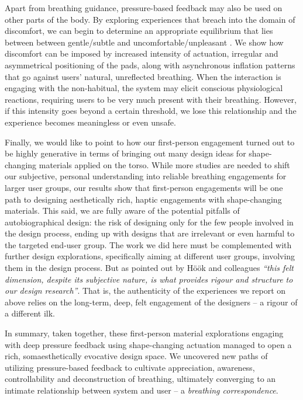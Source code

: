Apart from breathing guidance, pressure-based feedback may also be used on other parts of the body. By exploring experiences that breach into the domain of discomfort, we can begin to determine an appropriate equilibrium that lies between between gentle/subtle and uncomfortable/unpleasant \cite{benford_uncomfortable_2012}. We show how discomfort can be imposed by increased intensity of actuation, irregular and asymmetrical positioning of the pads, along with asynchronous inflation patterns that go against users' natural, unreflected breathing. When the interaction is engaging with the non-habitual, the system may elicit conscious physiological reactions, requiring users to be very much present with their breathing. However, if this intensity goes beyond a certain threshold, we lose this relationship and the experience becomes meaningless or even unsafe.


Finally, we would like to point to how our first-person engagement turned out to be highly generative in terms of bringing out many design ideas for shape-changing materials applied on the torso. While more studies are needed to shift our subjective, personal understanding into reliable breathing engagements for larger user groups, our results show that first-person engagements will be one path to designing aesthetically rich, haptic engagements with shape-changing materials. This said, we are fully aware of the potential pitfalls of autobiographical design: the risk of designing only for the few people involved in the design process, ending up with designs that are irrelevant or even harmful to the targeted end-user group. The work we did here must be complemented with further design explorations, specifically aiming at different user groups, involving them in the design process. But as pointed out by Höök and colleagues \cite{hook_embracing_2018} \textit{``this felt
dimension, despite its subjective nature, is what provides rigour and structure to our design research''}. That is, the authenticity of the experiences we report on above relies on the long-term, deep, felt engagement of the designers -- a rigour of a different ilk.

In summary, taken together, these first-person material explorations engaging with deep pressure feedback using shape-changing actuation managed to open a rich, somaesthetically evocative design space. We uncovered new paths of utilizing pressure-based feedback to cultivate appreciation, awareness, controllability and deconstruction of breathing, ultimately converging to an intimate relationship between system and user -- a \textit{breathing correspondence}.
